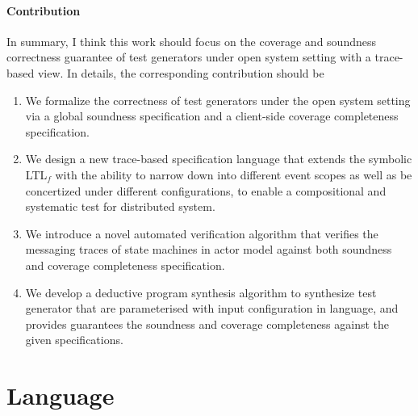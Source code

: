\paragraph{Contribution} In summary, I think this work should focus on the coverage and soundness correctness guarantee of test generators under open system setting with a trace-based view. In details, the corresponding contribution should be
\begin{enumerate}
    \item We formalize the correctness of test generators under the open system setting via a global soundness specification and a client-side coverage completeness specification.
    \item We design a new trace-based specification language that extends the symbolic LTL$_f$ with the ability to narrow down into different event scopes as well as be concertized under different configurations, to enable a compositional and systematic test for distributed system.
    \item We introduce a novel automated verification algorithm that verifies the messaging traces of state machines in actor model against both soundness and coverage completeness specification.
    \item We develop a deductive program synthesis algorithm to synthesize test generator that are parameterised with input configuration in  language, and provides guarantees the soundness and coverage completeness against the given specifications.
\end{enumerate}

\section{Language}

